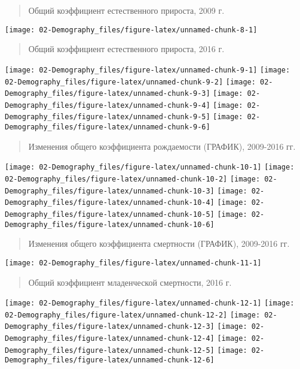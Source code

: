 \documentclass[]{book}
\begin{document}
\begin{quote}
Общий коэффициент естественного прироста, 2009 г.
\end{quote}

\texttt{[image: 02-Demography\_files/figure-latex/unnamed-chunk-8-1]}

\begin{quote}
Общий коэффициент естественного прироста, 2016 г.
\end{quote}

\texttt{[image: 02-Demography\_files/figure-latex/unnamed-chunk-9-1]}
\texttt{[image: 02-Demography\_files/figure-latex/unnamed-chunk-9-2]}
\texttt{[image: 02-Demography\_files/figure-latex/unnamed-chunk-9-3]}
\texttt{[image: 02-Demography\_files/figure-latex/unnamed-chunk-9-4]}
\texttt{[image: 02-Demography\_files/figure-latex/unnamed-chunk-9-5]}
\texttt{[image: 02-Demography\_files/figure-latex/unnamed-chunk-9-6]}

\begin{quote}
Изменения общего коэффициента рождаемости (ГРАФИК), 2009-2016 гг.
\end{quote}

\texttt{[image: 02-Demography\_files/figure-latex/unnamed-chunk-10-1]}
\texttt{[image: 02-Demography\_files/figure-latex/unnamed-chunk-10-2]}
\texttt{[image: 02-Demography\_files/figure-latex/unnamed-chunk-10-3]}
\texttt{[image: 02-Demography\_files/figure-latex/unnamed-chunk-10-4]}
\texttt{[image: 02-Demography\_files/figure-latex/unnamed-chunk-10-5]}
\texttt{[image: 02-Demography\_files/figure-latex/unnamed-chunk-10-6]}

\begin{quote}
Изменения общего коэффициента смертности (ГРАФИК), 2009-2016 гг.
\end{quote}

\texttt{[image: 02-Demography\_files/figure-latex/unnamed-chunk-11-1]}

\begin{quote}
Общий коэффициент младенческой смертности, 2016 г.
\end{quote}

\texttt{[image: 02-Demography\_files/figure-latex/unnamed-chunk-12-1]}
\texttt{[image: 02-Demography\_files/figure-latex/unnamed-chunk-12-2]}
\texttt{[image: 02-Demography\_files/figure-latex/unnamed-chunk-12-3]}
\texttt{[image: 02-Demography\_files/figure-latex/unnamed-chunk-12-4]}
\texttt{[image: 02-Demography\_files/figure-latex/unnamed-chunk-12-5]}
\texttt{[image: 02-Demography\_files/figure-latex/unnamed-chunk-12-6]}
\end{document}
